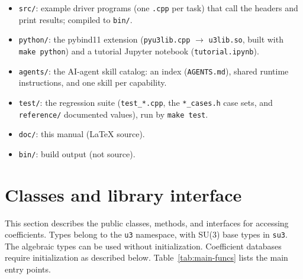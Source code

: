 \documentclass[aps,onecolumn,10pt,superscriptaddress,floatfix,nofootinbib]{revtex4}
\begin{document}
\begin{itemize}
\begin{itemize}
    \end{itemize}
    \item \verb|src/|: example driver programs (one \verb|.cpp| per task) that call the headers and print results; compiled to \verb|bin/|.
    \item \verb|python/|: the pybind11 extension (\verb|pyu3lib.cpp| $\to$ \verb|u3lib.so|, built with \verb|make python|) and a tutorial Jupyter notebook (\verb|tutorial.ipynb|).
    \item \verb|agents/|: the AI-agent skill catalog: an index (\verb|AGENTS.md|), shared runtime instructions, and one skill per capability.
    \item \verb|test/|: the regression suite (\verb|test_*.cpp|, the \verb|*_cases.h| case sets, and \verb|reference/| documented values), run by \verb|make test|.
    \item \verb|doc/|: this manual (LaTeX source).
    \item \verb|bin/|: build output (not source).
\end{itemize}

\section{Classes and library interface}
\label{sec:classes}

This section describes the public classes, methods, and interfaces for accessing
coefficients. Types belong to the \verb|u3| namespace, with SU(3) base types in
\verb|su3|. The algebraic types can be used without initialization. Coefficient
databases require initialization as described below.
Table~\ref{tab:main-funcs} lists the main entry points.
\end{document}
